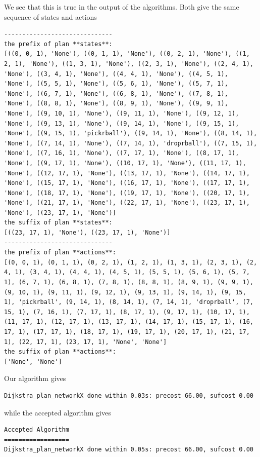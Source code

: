 We see that this is true in the output of the algorithms. Both give the same sequence of states and actions
\begin{lstlisting}
------------------------------
the prefix of plan **states**:
[((0, 0, 1), 'None'), ((0, 1, 1), 'None'), ((0, 2, 1), 'None'), ((1, 2, 1), 'None'), ((1, 3, 1), 'None'), ((2, 3, 1), 'None'), ((2, 4, 1), 'None'), ((3, 4, 1), 'None'), ((4, 4, 1), 'None'), ((4, 5, 1), 'None'), ((5, 5, 1), 'None'), ((5, 6, 1), 'None'), ((5, 7, 1), 'None'), ((6, 7, 1), 'None'), ((6, 8, 1), 'None'), ((7, 8, 1), 'None'), ((8, 8, 1), 'None'), ((8, 9, 1), 'None'), ((9, 9, 1), 'None'), ((9, 10, 1), 'None'), ((9, 11, 1), 'None'), ((9, 12, 1), 'None'), ((9, 13, 1), 'None'), ((9, 14, 1), 'None'), ((9, 15, 1), 'None'), ((9, 15, 1), 'pickrball'), ((9, 14, 1), 'None'), ((8, 14, 1), 'None'), ((7, 14, 1), 'None'), ((7, 14, 1), 'droprball'), ((7, 15, 1), 'None'), ((7, 16, 1), 'None'), ((7, 17, 1), 'None'), ((8, 17, 1), 'None'), ((9, 17, 1), 'None'), ((10, 17, 1), 'None'), ((11, 17, 1), 'None'), ((12, 17, 1), 'None'), ((13, 17, 1), 'None'), ((14, 17, 1), 'None'), ((15, 17, 1), 'None'), ((16, 17, 1), 'None'), ((17, 17, 1), 'None'), ((18, 17, 1), 'None'), ((19, 17, 1), 'None'), ((20, 17, 1), 'None'), ((21, 17, 1), 'None'), ((22, 17, 1), 'None'), ((23, 17, 1), 'None'), ((23, 17, 1), 'None')]
the suffix of plan **states**:
[((23, 17, 1), 'None'), ((23, 17, 1), 'None')]
------------------------------
the prefix of plan **actions**:
[(0, 0, 1), (0, 1, 1), (0, 2, 1), (1, 2, 1), (1, 3, 1), (2, 3, 1), (2, 4, 1), (3, 4, 1), (4, 4, 1), (4, 5, 1), (5, 5, 1), (5, 6, 1), (5, 7, 1), (6, 7, 1), (6, 8, 1), (7, 8, 1), (8, 8, 1), (8, 9, 1), (9, 9, 1), (9, 10, 1), (9, 11, 1), (9, 12, 1), (9, 13, 1), (9, 14, 1), (9, 15, 1), 'pickrball', (9, 14, 1), (8, 14, 1), (7, 14, 1), 'droprball', (7, 15, 1), (7, 16, 1), (7, 17, 1), (8, 17, 1), (9, 17, 1), (10, 17, 1), (11, 17, 1), (12, 17, 1), (13, 17, 1), (14, 17, 1), (15, 17, 1), (16, 17, 1), (17, 17, 1), (18, 17, 1), (19, 17, 1), (20, 17, 1), (21, 17, 1), (22, 17, 1), (23, 17, 1), 'None', 'None']
the suffix of plan **actions**:
['None', 'None']
\end{lstlisting}

Our algorithm gives 
\begin{lstlisting}
Dijkstra_plan_networkX done within 0.03s: precost 66.00, sufcost 0.00
\end{lstlisting}
while the accepted algorithm gives 

\begin{lstlisting}
Accepted Algorithm
==================
Dijkstra_plan_networkX done within 0.05s: precost 66.00, sufcost 0.00
\end{lstlisting}


